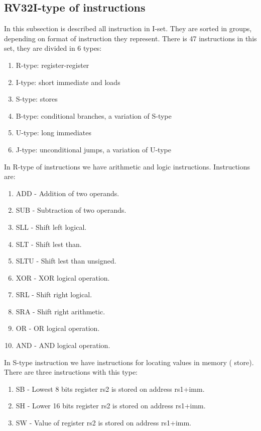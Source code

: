 \documentclass{scrreprt}
\begin{document}
    \subsection*{RV32I-type of instructions}
    In this subsection is described all instruction in I-set. They are sorted in groups, depending on format of instruction they represent. There is 47 instructions in this set, they are divided in 6 types: 
    \begin{enumerate}
        \item  R-type: register-register
        \item  I-type: short immediate and loads
        \item  S-type: stores
        \item  B-type: conditional branches, a variation of S-type
        \item  U-type: long immediates
        \item  J-type: unconditional jumps, a variation of U-type
    \end{enumerate}
    In R-type of instructions we have arithmetic and logic instructions. Instructions are:
    \begin{enumerate}
        \item ADD - Addition of two operands. 
        \item SUB - Subtraction of two operands. 
        \item SLL - Shift left logical. 
        \item SLT - Shift lest than. 
        \item SLTU - Shift lest than unsigned. 
        \item XOR - XOR logical operation. 
        \item SRL - Shift right logical. 
        \item SRA - Shift right arithmetic. 
        \item OR - OR logical operation. 
        \item AND - AND logical operation.
    \end{enumerate}
    \hfill \break
    In S-type instruction we have instructions for locating values in memory ( store). There are three instructions with this type:
    \begin{enumerate}
        \item SB - Lowest 8 bits register rs2 is stored on address rs1+imm. 
        \item SH - Lower 16 bits register rs2 is stored on address rs1+imm. 
        \item SW - Value of register rs2 is stored on address rs1+imm. 
    \end{enumerate}
\end{document}
